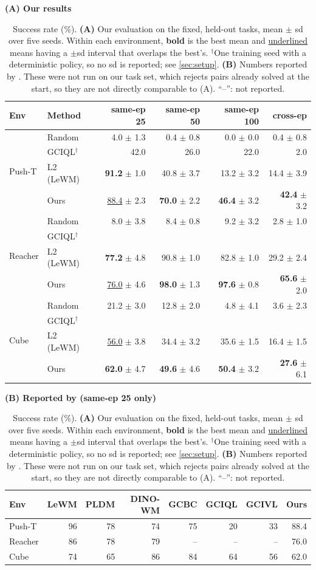 \documentclass{article} %
\begin{document}
\begin{table}[t]
\centering\small
\caption{Success rate (\%). \textbf{(A)} Our evaluation on the fixed, held-out tasks, mean $\pm$ sd over five
seeds. Within each environment, \textbf{bold} is the best mean and \underline{underlined} means having a $\pm$sd interval that overlaps the best's. $^{\dagger}$One training seed with a deterministic policy, so no sd is reported; see \cref{sec:setup}. \textbf{(B)} Numbers reported by \citet{lewm}. These were not run on our task set, which rejects pairs already solved at the start, so they are not directly comparable to (A). ``--'': not reported.}
\label{tab:main}
\textbf{(A) Our results}\par\smallskip
\begin{tabular}{llrrrr}
\toprule
Env & Method & same-ep 25 & same-ep 50 & same-ep 100 & cross-ep \\
\midrule
\multirow{4}{*}{Push-T} & Random & 4.0 $\pm$ 1.3 & 0.4 $\pm$ 0.8 & 0.0 $\pm$ 0.0 & 0.4 $\pm$ 0.8 \\
 & GCIQL$^{\dagger}$ & 42.0 & 26.0 & 22.0 & 2.0 \\
 & L2 (LeWM) & \textbf{91.2} $\pm$ 1.0 & 40.8 $\pm$ 3.7 & 13.2 $\pm$ 3.2 & 14.4 $\pm$ 3.9 \\
 & Ours & \underline{88.4} $\pm$ 2.3 & \textbf{70.0} $\pm$ 2.2 & \textbf{46.4} $\pm$ 3.2 & \textbf{42.4} $\pm$ 3.2 \\
\midrule
\multirow{4}{*}{Reacher} & Random & 8.0 $\pm$ 3.8 & 8.4 $\pm$ 0.8 & 9.2 $\pm$ 3.2 & 2.8 $\pm$ 1.0 \\
 & GCIQL$^{\dagger}$ &  &  &  &  \\
 & L2 (LeWM) & \textbf{77.2} $\pm$ 4.8 & 90.8 $\pm$ 1.0 & 82.8 $\pm$ 1.0 & 29.2 $\pm$ 2.4 \\
 & Ours & \underline{76.0} $\pm$ 4.6 & \textbf{98.0} $\pm$ 1.3 & \textbf{97.6} $\pm$ 0.8 & \textbf{65.6} $\pm$ 2.0 \\
\midrule
\multirow{4}{*}{Cube} & Random & 21.2 $\pm$ 3.0 & 12.8 $\pm$ 2.0 & 4.8 $\pm$ 4.1 & 3.6 $\pm$ 2.3 \\
 & GCIQL$^{\dagger}$ &  &  &  &  \\
 & L2 (LeWM) & \underline{56.0} $\pm$ 3.8 & 34.4 $\pm$ 3.2 & 35.6 $\pm$ 1.5 & 16.4 $\pm$ 1.5 \\
 & Ours & \textbf{62.0} $\pm$ 4.7 & \textbf{49.6} $\pm$ 4.6 & \textbf{50.4} $\pm$ 3.2 & \textbf{27.6} $\pm$ 6.1 \\
\bottomrule
\end{tabular}

\bigskip
\textbf{(B) Reported by \citet{lewm} (same-ep 25 only)}\par\smallskip
\begin{tabular}{lrrrrrr|r}
\toprule
Env & LeWM & PLDM & DINO-WM & GCBC & GCIQL & GCIVL & Ours \\
\midrule
Push-T & 96 & 78 & 74 & 75 & 20 & 33 & 88.4 \\
Reacher & 86 & 78 & 79 & -- & -- & -- & 76.0 \\
Cube & 74 & 65 & 86 & 84 & 64 & 56 & 62.0 \\
\bottomrule
\end{tabular}
\end{table}
\end{document}
